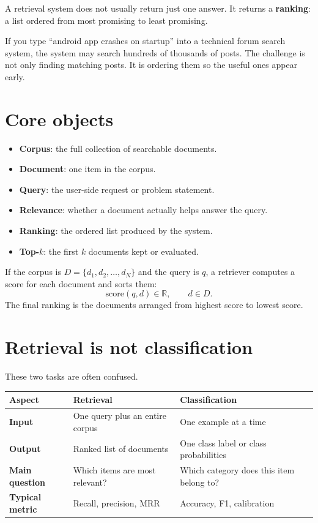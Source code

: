 \documentclass[11pt,oneside]{report}
\newcommand{\term}[1]{\textbf{#1}}
\begin{document}
A retrieval system does not usually return just one answer. It returns a \term{ranking}: a list ordered from most promising to least promising.

\begin{intuitionbox}
If you type ``android app crashes on startup'' into a technical forum search system, the system may search hundreds of thousands of posts. The challenge is not only finding matching posts. It is ordering them so the useful ones appear early.
\end{intuitionbox}

\section*{Core objects}
\begin{itemize}
\item \term{Corpus}: the full collection of searchable documents.
\item \term{Document}: one item in the corpus.
\item \term{Query}: the user-side request or problem statement.
\item \term{Relevance}: whether a document actually helps answer the query.
\item \term{Ranking}: the ordered list produced by the system.
\item \term{Top-$k$}: the first $k$ documents kept or evaluated.
\end{itemize}

\begin{formulabox}
If the corpus is $D=\{d_1,d_2,\dots,d_N\}$ and the query is $q$, a retriever computes a score for each document and sorts them:
\[
\text{score}(q,d)\in\mathbb{R}, \qquad d\in D.
\]
The final ranking is the documents arranged from highest score to lowest score.
\end{formulabox}

\section*{Retrieval is not classification}
These two tasks are often confused.
\begin{center}
\begin{tabularx}{\textwidth}{>{\bfseries}lYY}
\toprule
Aspect & Retrieval & Classification \\
\midrule
Input & One query plus an entire corpus & One example at a time \\
Output & Ranked list of documents & One class label or class probabilities \\
Main question & Which items are most relevant? & Which category does this item belong to? \\
Typical metric & Recall, precision, MRR & Accuracy, F1, calibration \\
\bottomrule
\end{tabularx}
\end{center}
\end{document}

